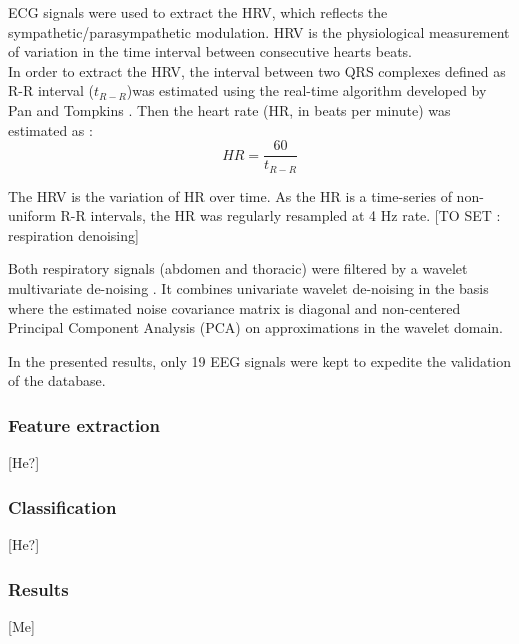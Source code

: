 \ac{ECG} signals were used to extract the \ac{HRV}, which reflects the sympathetic/parasympathetic modulation. \ac{HRV} is the physiological measurement of variation in the time interval between consecutive hearts beats.\\
In order to extract the \ac{HRV}, the interval between two QRS complexes defined as R-R interval ($t_{R-R}$)was estimated using the real-time algorithm developed by Pan and Tompkins \cite{HR}. Then the heart rate (HR, in beats per minute) was estimated as :
\begin{equation}
	HR = \frac{60}{t_{R-R}}
\end{equation}

The \ac{HRV} is the variation of HR over time. As the HR is a time-series of non-uniform R-R intervals, the HR was regularly resampled at 4 Hz rate.
[TO SET : respiration denoising]

Both respiratory signals (abdomen and thoracic) were filtered by a wavelet multivariate de-noising
\cite{waveletDenoise}.
It combines univariate wavelet de-noising in the basis where the estimated noise covariance matrix is diagonal and non-centered Principal Component Analysis (PCA) on approximations in the wavelet domain.

In the presented results, only 19 \ac{EEG} signals were kept to expedite the validation of the database.


\subsubsection{Feature extraction}
[He?]
\subsubsection{Classification}
[He?]

\subsubsection{Results}
[Me]


